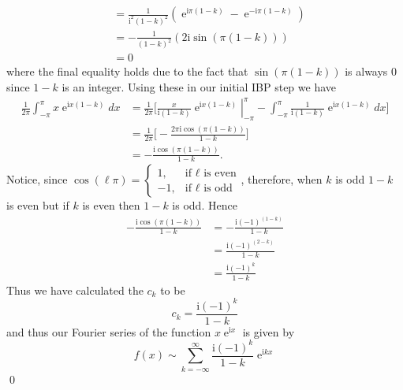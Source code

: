 \documentclass[10pt]{amsart}
\newcommand{\I}{\mathrm{i}}
\DeclareMathOperator{\E}{e}
\theoremstyle{nonumberplain}
\begin{document}
\begin{enumerate}[label={\bf {\arabic*}:}]
\begin{enumerate}
\begin{align*}
	&= \frac 1 {\I^2(1 - k)^2} \left(  \E^{\I \pi (1 - k)} - \E^{- \I \pi (1 - k)} \right) \\
	&= - \frac 1 {(1 - k)^2} \left(  2 \I \sin (\pi (1 - k)) \right) \\
	&= 0
\end{align*}
where the final equality holds due to the fact that $\sin(\pi (1 - k))$ is always 0 since $1 - k$ is an integer.
Using these in our initial IBP step we have
\begin{align*}
\frac 1 {2 \pi} \int_{-\pi}^{\pi} x\E^{\I x (1 - k)}dx
	&= \frac 1 {2 \pi} \Bigg[ \left. \frac x {\I(1 - k)} \E^{\I x (1 - k)}\right|_{-\pi}^{\pi} - \int_{-\pi}^{\pi} \frac 1 {\I(1 - k)} \E^{\I x (1 - k)} dx \Bigg] \\
	&= \frac 1 {2 \pi} \Bigg[ - \frac {2 \pi \I \cos (\pi (1 - k)) } {1 - k} \Bigg] \\
	&= - \frac {\I \cos (\pi (1 - k)) } {1 - k}.
\end{align*}
Notice, since $\cos(\ell \pi) = \begin{cases} 1, &\text{if $\ell$ is even} \\ -1, &\text{if $\ell$ is odd} \end{cases}$, therefore, when $k$ is odd $1 - k$ is even but if $k$ is even then $1 - k$ is odd.
Hence
\begin{align*}
- \frac {\I \cos (\pi (1 - k)) } {1 - k} &= - \frac {\I (-1)^{(1 - k)} } {1 - k} \\
	&= \frac {\I (-1)^{(2 - k)} } {1 - k} \\
	&= \frac {\I (-1)^{k} } {1 - k}
\end{align*}
Thus we have calculated the $c_k$ to be
$$
c_k = \frac {\I (-1)^{k} } {1 - k}
$$
and thus our Fourier series of the function $x \E^{\I x}$ is given by
$$
f(x) \sim \sum_{k=-\infty}^{\infty} \frac {\I (-1)^{k} } {1 - k} \E^{\I k x}
$$
\qed \\


\end{enumerate}
\end{enumerate}
\end{document}
